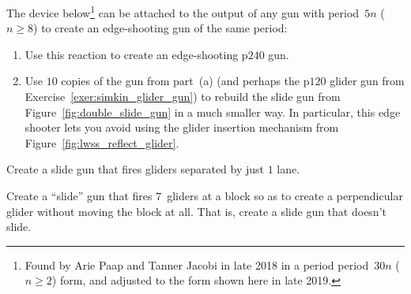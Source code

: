 \begin{multicols}{2}
	
	\mfilbreak
	
	
	\begin{problem}\label{exer:edge_shoot_30n}
		The device below\footnote{Found by Arie Paap and Tanner Jacobi in late 2018 in a period period~$30n$ ($n \geq 2$) form, and adjusted to the form shown here in late 2019.} can be attached to the output of any gun with period~$5n$ ($n \geq 8$) to create an edge-shooting gun of the same period:
		\begin{center}
		\end{center}
		
		\begin{enumerate}[label=\bf\color{ocre}(\alph*)]
			\item Use this reaction to create an edge-shooting p$240$ gun.
			
			\item Use $10$ copies of the gun from part~(a) (and perhaps the p$120$ glider gun from Exercise~\ref{exer:simkin_glider_gun}) to rebuild the slide gun from Figure~\ref{fig:double_slide_gun} in a much smaller way. In particular, this edge shooter lets you avoid using the glider insertion mechanism from Figure~\ref{fig:lwss_reflect_glider}.
		\end{enumerate}
	\end{problem}
	
	
	\mfilbreak
	
	
	\begin{problem}\label{exer:slide_gun_hd}
		Create a slide gun that fires gliders separated by just $1$ lane.
		
	\end{problem}
	
	
	\mfilbreak
	
	
	\begin{problem}\label{exer:slide_gun_no_slide}
		Create a ``slide'' gun that fires $7$~gliders at a block so as to create a perpendicular glider without moving the block at all. That is, create a slide gun that doesn't slide.
	\end{problem}
	
	
	\mfilbreak
	

\end{multicols}

